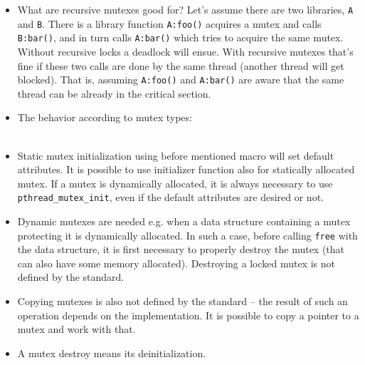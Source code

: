 \begin{itemize}
\item What are recursive mutexes good for? Let's assume there are two
libraries, \texttt{A} and \texttt{B}. There is a library
function \texttt{A:foo()} acquires a mutex and calls \texttt{B:bar()},
and in turn calls \texttt{A:bar()} which tries to acquire the same
mutex.  Without recursive locks a deadlock will ensue.  With recursive mutexes
that's fine if these two calls are done by the same thread (another thread will
get blocked).  That is, assuming \texttt{A:foo()} and \texttt{A:bar()} are aware
that the same thread can be already in the critical section.
\item {} The behavior according to mutex types:\\
\\
\item Static mutex initialization using before mentioned macro will set default
attributes. It is possible to use initializer function also for statically
allocated mutex. If a mutex is dynamically allocated, it is always necessary to
use \texttt{pthread\_mutex\_init}, even if the default attributes are desired or
not.
\item Dynamic mutexes are needed e.g. when a data structure containing a mutex
protecting it is dynamically allocated.  In such a case, before calling
\texttt{free} with the data structure, it is first necessary to properly destroy
the mutex (that can also have some memory allocated).  Destroying a locked mutex
is not defined by the standard.
\item Copying mutexes is also not defined by the standard -- the result of such
an operation depends on the implementation.  It is possible to copy a pointer to
a mutex and work with that.
\item A mutex destroy means its deinitialization.
\end{itemize}



